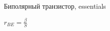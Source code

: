 \documentclass[
a4paper
,11pt
,landscape
,twocolumn]{letter}
\begin{document}
\thispagestyle{empty}

\begin{Large}
    Биполярный транзистор, essentials
\end{Large}

\lipsum[1-1]



$r_{BE} = \frac{\beta}{S}$
\end{document}
